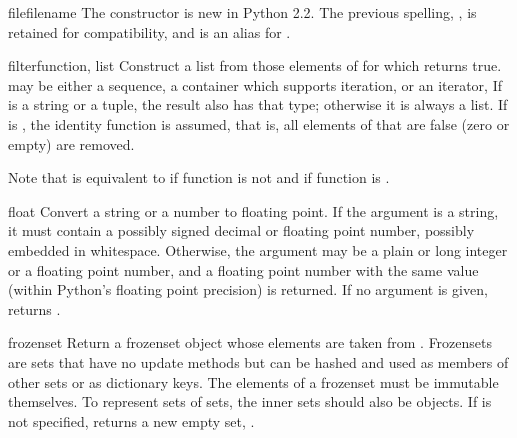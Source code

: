 \begin{funcdesc}{file}{filename}
  The  constructor is new in Python 2.2.  The previous
  spelling, , is retained for compatibility, and is an
  alias for .
\end{funcdesc}

\begin{funcdesc}{filter}{function, list}
  Construct a list from those elements of  for which
   returns true.   may be either a sequence, a
  container which supports iteration, or an iterator,  If 
  is a string or a tuple, the result also has that type; otherwise it
  is always a list.  If  is , the identity
  function is assumed, that is, all elements of  that are false
  (zero or empty) are removed.

  Note that  is equivalent to
   if function is
  not  and  if
  function is .
\end{funcdesc}

\begin{funcdesc}{float}{}
  Convert a string or a number to floating point.  If the argument is a
  string, it must contain a possibly signed decimal or floating point
  number, possibly embedded in whitespace. Otherwise, the argument may be a plain
  or long integer or a floating point number, and a floating point
  number with the same value (within Python's floating point
  precision) is returned.  If no argument is given, returns .

\end{funcdesc}

\begin{funcdesc}{frozenset}{}
  Return a frozenset object whose elements are taken from .
  Frozensets are sets that have no update methods but can be hashed and
  used as members of other sets or as dictionary keys.  The elements of
  a frozenset must be immutable themselves.  To represent sets of sets,
  the inner sets should also be  objects.  If
   is not specified, returns a new empty set,
  .
\end{funcdesc}

